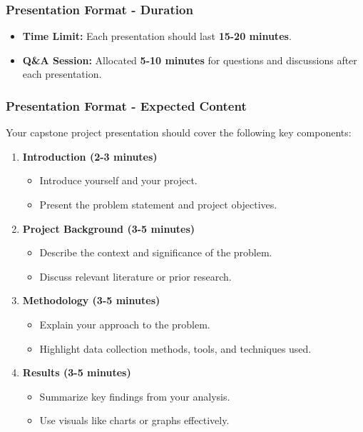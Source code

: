 \documentclass{beamer}
\begin{document}
\begin{frame}[fragile]
    \frametitle{Presentation Format - Duration}
    \begin{itemize}
        \item \textbf{Time Limit:} Each presentation should last \textbf{15-20 minutes}.
        \item \textbf{Q\&A Session:} Allocated \textbf{5-10 minutes} for questions and discussions after each presentation.
    \end{itemize}
\end{frame}

\begin{frame}[fragile]
    \frametitle{Presentation Format - Expected Content}
    Your capstone project presentation should cover the following key components:
    \begin{enumerate}
        \item \textbf{Introduction (2-3 minutes)}
            \begin{itemize}
                \item Introduce yourself and your project.
                \item Present the problem statement and project objectives.
            \end{itemize}
        \item \textbf{Project Background (3-5 minutes)}
            \begin{itemize}
                \item Describe the context and significance of the problem.
                \item Discuss relevant literature or prior research.
            \end{itemize}
        \item \textbf{Methodology (3-5 minutes)}
            \begin{itemize}
                \item Explain your approach to the problem.
                \item Highlight data collection methods, tools, and techniques used.
            \end{itemize}
        \item \textbf{Results (3-5 minutes)}
            \begin{itemize}
                \item Summarize key findings from your analysis.
                \item Use visuals like charts or graphs effectively.
            \end{itemize}

\end{enumerate}
\end{frame}
\end{document}
